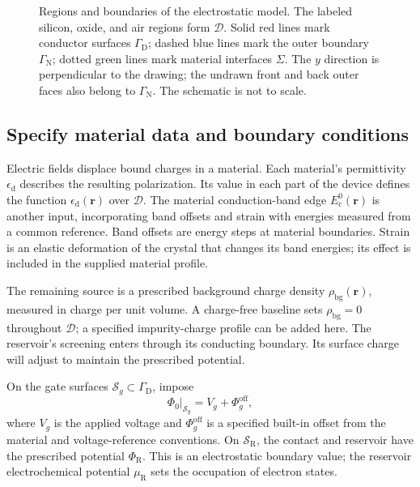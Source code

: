\begin{figure}[!t]
 \centering
 
 \caption{Regions and boundaries of the electrostatic model.
 The labeled silicon, oxide, and air regions form $\mathcal D$.
 Solid red lines mark conductor surfaces $\Gamma_{\mathrm D}$;
 dashed blue lines mark the outer boundary $\Gamma_{\mathrm N}$;
 dotted green lines mark material interfaces $\Sigma$.
 The $y$ direction is perpendicular to the drawing; the undrawn
 front and back outer faces also belong to $\Gamma_{\mathrm N}$.
 The schematic is not to scale.}
 \label{fig:device-electrostatic-regions}
\end{figure}

\subsection{Specify material data and boundary conditions}
Electric fields displace bound charges in a material. Each
material's permittivity $\epsilon_{\mathrm d}$ describes the
resulting polarization. Its value in each part of the device
defines the function $\epsilon_{\mathrm d}(\mathbf r)$ over
$\mathcal D$. The material conduction-band edge
$E_{\mathrm c}^{0}(\mathbf r)$ is another input, incorporating
band offsets and strain with energies measured from a common reference.
Band offsets are energy steps at material boundaries. Strain is an
elastic deformation of the crystal that changes its band energies;
its effect is included in the supplied material profile.

The remaining source is a prescribed background charge density
$\rho_{\mathrm{bg}}(\mathbf r)$, measured in charge per unit
volume. A charge-free baseline sets $\rho_{\mathrm{bg}}=0$
throughout $\mathcal D$; a specified impurity-charge profile can
be added here. The reservoir's screening enters through its
conducting boundary. Its surface charge will adjust to maintain
the prescribed potential.

On the gate surfaces $\mathcal S_g\subset\Gamma_{\mathrm D}$, impose
\begin{equation}
 \left.\Phi_0\right|_{\mathcal S_g}
       =V_g+\Phi_g^{\mathrm{off}},
 \label{eq:device-gate-boundary}
\end{equation}
where $V_g$ is the applied voltage and
$\Phi_g^{\mathrm{off}}$ is a specified built-in offset from the
material and voltage-reference conventions.
On $\mathcal S_{\mathrm R}$, the contact and reservoir have the
prescribed potential $\Phi_{\mathrm R}$. This is an electrostatic boundary
value; the reservoir electrochemical potential $\mu_{\mathrm R}$
sets the occupation of electron states.

